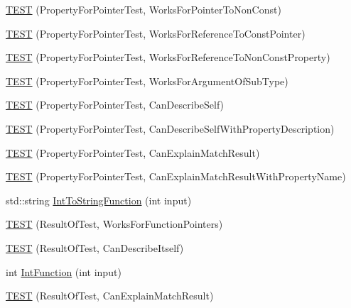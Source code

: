 \begin{DoxyCompactItemize}
\item 
\mbox{\hyperlink{namespacetesting_1_1gmock__matchers__test_acc639f3cbeacf4af712bf02ac451b160}{T\+E\+ST}} (Property\+For\+Pointer\+Test, Works\+For\+Pointer\+To\+Non\+Const)
\item 
\mbox{\hyperlink{namespacetesting_1_1gmock__matchers__test_a028687dfb04ec008ea129f9cc95aac62}{T\+E\+ST}} (Property\+For\+Pointer\+Test, Works\+For\+Reference\+To\+Const\+Pointer)
\item 
\mbox{\hyperlink{namespacetesting_1_1gmock__matchers__test_a78762b60c9d0c985916b698e6d4c55e3}{T\+E\+ST}} (Property\+For\+Pointer\+Test, Works\+For\+Reference\+To\+Non\+Const\+Property)
\item 
\mbox{\hyperlink{namespacetesting_1_1gmock__matchers__test_a4c2f4b483550e2e70b09eea3836b83e0}{T\+E\+ST}} (Property\+For\+Pointer\+Test, Works\+For\+Argument\+Of\+Sub\+Type)
\item 
\mbox{\hyperlink{namespacetesting_1_1gmock__matchers__test_a064fc5dd5ca0106e8ed0fbc483472186}{T\+E\+ST}} (Property\+For\+Pointer\+Test, Can\+Describe\+Self)
\item 
\mbox{\hyperlink{namespacetesting_1_1gmock__matchers__test_a8c0578e07cfe031fa9de3ed3e5bde34a}{T\+E\+ST}} (Property\+For\+Pointer\+Test, Can\+Describe\+Self\+With\+Property\+Description)
\item 
\mbox{\hyperlink{namespacetesting_1_1gmock__matchers__test_a1a7e2a9641a06e492d58c75d900330d3}{T\+E\+ST}} (Property\+For\+Pointer\+Test, Can\+Explain\+Match\+Result)
\item 
\mbox{\hyperlink{namespacetesting_1_1gmock__matchers__test_a09471d531d0bbeaca60cb850dfe6f33e}{T\+E\+ST}} (Property\+For\+Pointer\+Test, Can\+Explain\+Match\+Result\+With\+Property\+Name)
\item 
std\+::string \mbox{\hyperlink{namespacetesting_1_1gmock__matchers__test_a94cad49187e6a3cc41d3ea59903214cf}{Int\+To\+String\+Function}} (int input)
\item 
\mbox{\hyperlink{namespacetesting_1_1gmock__matchers__test_a5aea17c7d3dd74cbc0cbf181b3a9e5f8}{T\+E\+ST}} (Result\+Of\+Test, Works\+For\+Function\+Pointers)
\item 
\mbox{\hyperlink{namespacetesting_1_1gmock__matchers__test_a1b5240d2272b679d7e3035554c2c5688}{T\+E\+ST}} (Result\+Of\+Test, Can\+Describe\+Itself)
\item 
int \mbox{\hyperlink{namespacetesting_1_1gmock__matchers__test_a6e957b9dcda1186c6274a8895d1514b5}{Int\+Function}} (int input)
\item 
\mbox{\hyperlink{namespacetesting_1_1gmock__matchers__test_ab7fe283b2955ca8bb11b2984a08eef33}{T\+E\+ST}} (Result\+Of\+Test, Can\+Explain\+Match\+Result)

\end{DoxyCompactItemize}
